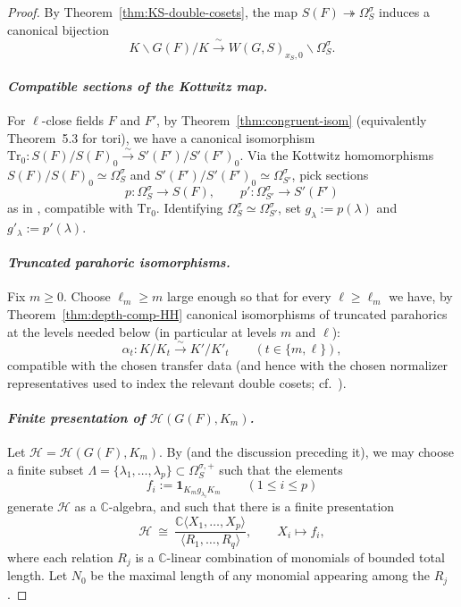 \documentclass[american]{article}
\numberwithin{equation}{section}
\numberwithin{figure}{section}
\theoremstyle{plain}
\theoremstyle{definition}
\theoremstyle{remark}
\newcommand{\Hc}{\mathcal{H}}
\newcommand{\one}{\mathbf{1}}
\newcommand{\C}{\mathbb{C}}
\begin{document}
\begin{proof}
By Theorem~\ref{thm:KS-double-cosets}, the map $S(F)\twoheadrightarrow\Omega_S^{\sigma}$ induces a canonical bijection
\[
   K\backslash G(F)/K \xrightarrow{\;\sim\;} W(G,S)_{x_S,0}\backslash{\Omega_S^{\sigma}}.
\]

\paragraph{\textit{Compatible sections of the Kottwitz map.}}
For \(\ell\)-close fields \(F\) and \(F'\), by Theorem~\ref{thm:congruent-isom} (equivalently Theorem~5.3 for tori),
we have a canonical isomorphism \(\mathrm{Tr}_0:S(F)/S(F)_0 \xrightarrow{\sim} S'(F')/S'(F')_0\).
Via the Kottwitz homomorphisms \(S(F)/S(F)_0\simeq \Omega_S^\sigma\) and \(S'(F')/S'(F')_0\simeq \Omega_{S'}^\sigma\),
pick sections
\[
p:\Omega_S^\sigma\to S(F),\qquad p':\Omega_{S'}^\sigma\to S'(F')
\]
as in \cite[Lem.~2.4]{ganapathy2022}, compatible with \(\mathrm{Tr}_0\).
Identifying \(\Omega_S^\sigma\simeq \Omega_{S'}^\sigma\), set \(g_\lambda:=p(\lambda)\) and \(g'_\lambda:=p'(\lambda)\).

\paragraph{\textit{Truncated parahoric isomorphisms.}}
Fix \(m\ge 0\). Choose \(\ell_m\ge m\) large enough so that for every \(\ell\ge \ell_m\) we have,
by Theorem~\ref{thm:depth-comp-HH} 
canonical isomorphisms of truncated parahorics at the levels needed below (in particular at levels \(m\) and \(\ell\)):
\[
  \alpha_t:K/K_t \xrightarrow{\sim} K'/K'_t\qquad (t\in\{m,\ell\}),
\]
compatible with the chosen transfer data (and hence with the chosen normalizer representatives used to index
the relevant double cosets; cf.\ \cite[\S4]{ganapathy2022}).

\paragraph{\textit{Finite presentation of \(\Hc(G(F),K_m)\).}}
Let \({\mathscr{H}}=\Hc(G(F),K_m)\). By \cite[Thm.~4.1]{ganapathy2022} (and the discussion preceding it), we may choose a finite subset
\(\Lambda=\{\lambda_1,\dots,\lambda_p\}\subset \Omega_S^{\sigma,+}\) such that the elements
\[
f_i:=\one_{K_m g_{\lambda_i}K_m}\qquad(1\le i\le p)
\]
generate \({\mathscr{H}}\) as a \(\C\)-algebra, and such that there is a finite presentation
\[
   {\mathscr{H}} \ \cong\ \frac{\C\langle X_1,\dots,X_p\rangle}{\langle R_1,\dots,R_q\rangle},
   \qquad X_i\mapsto f_i,
\]
where each relation \(R_j\) is a \(\C\)-linear combination of monomials of bounded total length.
Let \(N_0\) be the maximal length of any monomial appearing among the \(R_j\).


\end{proof}
\end{document}
